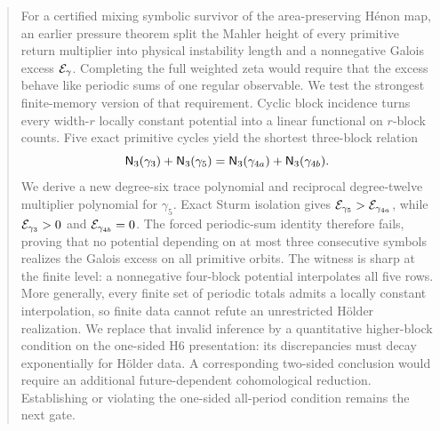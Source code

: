 \begin{abstract}
For a certified mixing symbolic survivor of the area-preserving H\'enon map,
an earlier pressure theorem split the Mahler height of every primitive return
multiplier into physical instability length and a nonnegative Galois excess
\(\Egal_\gamma\).  Completing the full weighted zeta would require that the
excess behave like periodic sums of one regular observable.  We test the
strongest finite-memory version of that requirement.  Cyclic block incidence
turns every width-\(r\) locally constant potential into a linear functional
on \(r\)-block counts.  Five exact primitive cycles yield the shortest
three-block relation
\[
 \Nblk_3(\gamma_3)+\Nblk_3(\gamma_5)
 =\Nblk_3(\gamma_{4a})+\Nblk_3(\gamma_{4b}).
\]
We derive a new degree-six trace polynomial and reciprocal degree-twelve
multiplier polynomial for \(\gamma_5\).  Exact Sturm isolation gives
\(\Egal_{\gamma_5}>\Egal_{\gamma_{4a}}\), while
\(\Egal_{\gamma_3}>0\) and \(\Egal_{\gamma_{4b}}=0\).  The forced periodic-sum
identity therefore fails, proving that no potential depending on at most
three consecutive symbols realizes the Galois excess on all primitive
orbits.  The witness is sharp at the finite level: a nonnegative four-block
potential interpolates all five rows.  More generally, every finite set of
periodic totals admits a locally constant interpolation, so finite data
cannot refute an unrestricted H\"older realization.  We replace that invalid
inference by a quantitative higher-block condition on the one-sided H6
presentation: its discrepancies must decay exponentially for H\"older data.
A corresponding two-sided conclusion would require an additional
future-dependent cohomological reduction.  Establishing or violating the
one-sided all-period condition remains the next gate.
\end{abstract}
